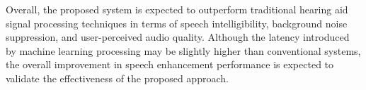 Overall, the proposed system is expected to outperform traditional hearing aid signal processing techniques in terms of speech intelligibility, background noise suppression, and user-perceived audio quality. Although the latency introduced by machine learning processing may be slightly higher than conventional systems, the overall improvement in speech enhancement performance is expected to validate the effectiveness of the proposed approach.
